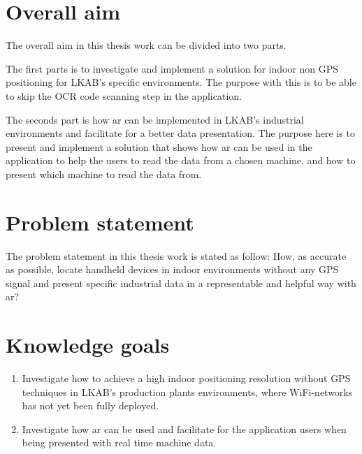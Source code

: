 \section{Overall aim} The overall aim in this thesis work can be divided into
two parts.

\bigskip

The first parts is to investigate and implement a solution for indoor non GPS
positioning for LKAB's specific environments.  The purpose with this is to be
able to skip the OCR code scanning step in the application.

\bigskip

The seconds part is how \acrfull{ar} can be implemented in LKAB's industrial
environments and facilitate for a better data presentation.  The purpose here is
to present and implement a solution that shows how \acrshort{ar} can be used in
the application to help the users to read the data from a chosen machine, and
how to present which machine to read the data from.


\section{Problem statement} The problem statement in this thesis work is stated
as follow: How, as accurate as possible, locate handheld devices in indoor
environments without any GPS signal and present specific industrial data in a
representable and helpful way with \acrlong{ar}?

\section{Knowledge goals} \begin{enumerate} \item \label{knowGoals:pos}
  Investigate how to achieve a high indoor positioning resolution without GPS
  techniques in LKAB's production plants environments, where WiFi-networks has
  not yet been fully deployed.

  \item \label{knowGoals:ar} Investigate how \acrshort{ar} can be used and
facilitate for the application users when being presented with real time machine
data.  \end{enumerate}

